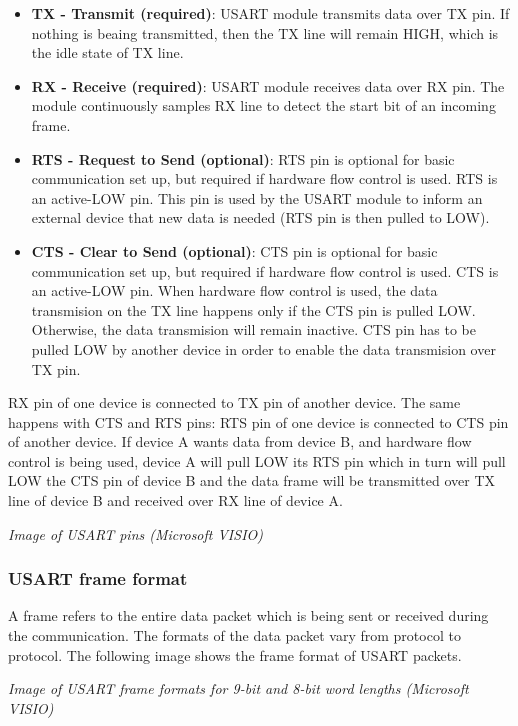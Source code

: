 \documentclass[
a4paper, %
11pt, %
onecolumn, %
openany, %
]{memoir}
\begin{document}
\begin{itemize}
	\item	\textbf{TX - Transmit (required)}: USART module transmits data over TX pin. If nothing is beaing transmitted, then the TX line will remain HIGH, which is the idle state of TX line.
	\item	\textbf{RX - Receive (required)}: USART module receives data over RX pin. The module continuously samples RX line to detect the start bit of an incoming frame.
	\item	\textbf{RTS - Request to Send (optional)}: RTS pin is optional for basic communication set up, but required if hardware flow control is used. RTS is an active-LOW pin. This pin is used by the USART module to inform an external device that new data is needed (RTS pin is then pulled to LOW).
	\item	\textbf{CTS - Clear to Send (optional)}: CTS pin is optional for basic communication set up, but required if hardware flow control is used. CTS is an active-LOW pin. When hardware flow control is used, the data transmision on the TX line happens only if the CTS pin is pulled LOW. Otherwise, the data transmision will remain inactive. CTS pin has to be pulled LOW by another device in order to enable the data transmision over TX pin.
\end{itemize}

\noindent RX pin of one device is connected to TX pin of another device. The same happens with CTS and RTS pins: RTS pin of one device is connected to CTS pin of another device. If device A wants data from device B, and hardware flow control is being used, device A will pull LOW its RTS pin which in turn will pull LOW the CTS pin of device B and the data frame will be transmitted over TX line of device B and received over RX line of device A.

\begin{center}
\textit{Image of USART pins (Microsoft VISIO)}
\end{center}

\subsubsection{USART frame format}
A frame refers to the entire data packet which is being sent or received during the communication. The formats of the data packet vary from protocol to protocol. The following image shows the frame format of USART packets.

\begin{center}
\textit{Image of USART frame formats for 9-bit and 8-bit word lengths (Microsoft VISIO)}
\end{center}
\end{document}
